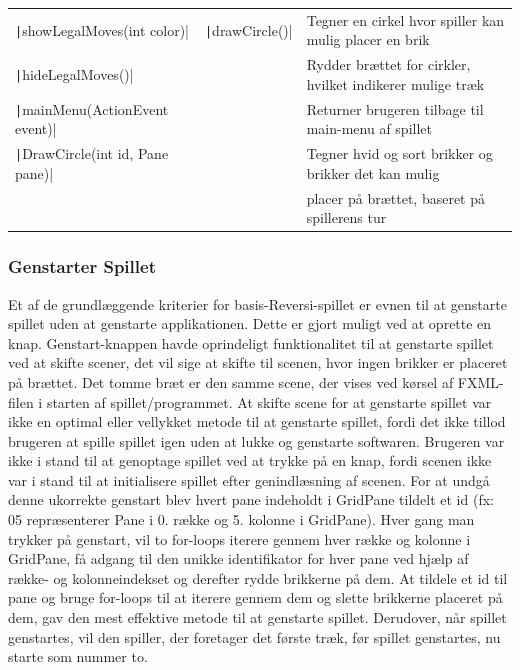 \begin{table}[H]
\begin{tabular}{lll}
        \texttt|showLegalMoves(int color)|        & \texttt|drawCircle()|    & Tegner en cirkel hvor spiller kan mulig placer en brik    \\
        \texttt|hideLegalMoves()|                 &                                    & Rydder brættet for cirkler, hvilket indikerer mulige træk \\
        \texttt|mainMenu(ActionEvent event)|      &                                    & Returner brugeren tilbage til main-menu af spillet        \\
        \texttt|DrawCircle(int id, Pane pane)|    &                                    & Tegner hvid og sort brikker og brikker det kan mulig      \\
                                                            &                                    & placer på brættet, baseret på spillerens tur              \\
        \bottomrule
    \end{tabular}
\end{table}
\subsubsection{Genstarter Spillet} \label{gs}
Et af de grundlæggende kriterier for basis-Reversi-spillet er evnen til at genstarte spillet uden at genstarte applikationen. Dette er gjort muligt ved at oprette en knap. Genstart-knappen havde oprindeligt funktionalitet til at genstarte spillet ved at skifte scener, det vil sige at skifte til scenen, hvor ingen brikker er placeret på brættet. Det tomme bræt er den samme scene, der vises ved kørsel af FXML-filen i starten af spillet/programmet. At skifte scene for at genstarte spillet var ikke en optimal eller vellykket metode til at genstarte spillet, fordi det ikke tillod brugeren at spille spillet igen uden at lukke og genstarte softwaren. Brugeren var ikke i stand til at genoptage spillet ved at trykke på en knap, fordi scenen ikke var i stand til at initialisere spillet efter genindlæsning af scenen.\newline
For at undgå denne ukorrekte genstart blev hvert pane indeholdt i GridPane tildelt et id (fx: 05 repræsenterer Pane i 0. række og 5. kolonne i GridPane). Hver gang man trykker på genstart, vil to for-loops iterere gennem hver række og kolonne i GridPane, få adgang til den unikke identifikator for hver pane ved hjælp af række- og kolonneindekset og derefter rydde brikkerne på dem. At tildele et id til pane og bruge for-loops til at iterere gennem dem og slette brikkerne placeret på dem, gav den mest effektive metode til at genstarte spillet. Derudover, når spillet genstartes, vil den spiller, der foretager det første træk, før spillet genstartes, nu starte som nummer to.